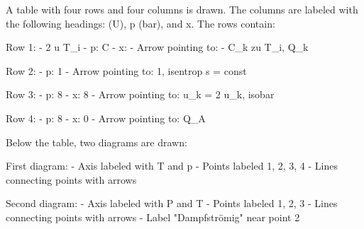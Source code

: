 A table with four rows and four columns is drawn. The columns are labeled with the following headings: (U), p (bar), and x. The rows contain:

Row 1: 
- 2 u T_i 
- p: C
- x: 
- Arrow pointing to: - C_k zu T_i, Q_k

Row 2:
- p: 1
- Arrow pointing to: 1, isentrop s = const

Row 3:
- p: 8
- x: 8
- Arrow pointing to: u_k = 2 u_k, isobar

Row 4:
- p: 8
- x: 0
- Arrow pointing to: Q_A

Below the table, two diagrams are drawn:

First diagram:
- Axis labeled with T and p
- Points labeled 1, 2, 3, 4
- Lines connecting points with arrows

Second diagram:
- Axis labeled with P and T
- Points labeled 1, 2, 3
- Lines connecting points with arrows
- Label "Dampfströmig" near point 2